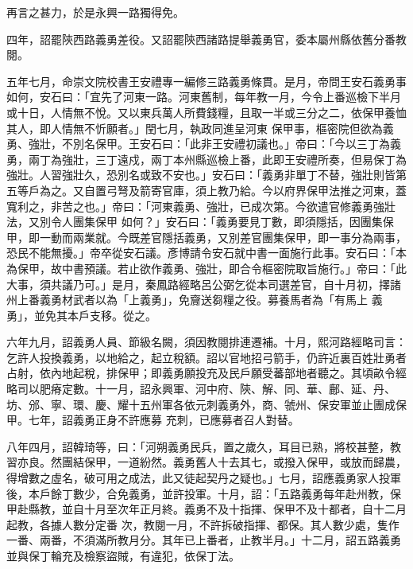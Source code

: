 \begin{pinyinscope}
 再言之甚力，於是永興一路獨得免。



 四年，詔罷陝西路義勇差役。又詔罷陝西諸路提舉義勇官，委本屬州縣依舊分番教閱。



 五年七月，命崇文院校書王安禮專一編修三路義勇條貫。是月，帝問王安石義勇事如何，安石曰：「宜先了河東一路。河東舊制，每年教一月，今令上番巡檢下半月或十日，人情無不悅。又以東兵萬人所費錢糧，且取一半或三分之二，依保甲養恤其人，即人情無不忻願者。」閏七月，執政同進呈河東
 保甲事，樞密院但欲為義勇、強壯，不別名保甲。王安石曰：「此非王安禮初議也。」帝曰：「今以三丁為義勇，兩丁為強壯，三丁遠戍，兩丁本州縣巡檢上番，此即王安禮所奏，但易保丁為強壯。人習強壯久，恐別名或致不安也。」安石曰：「義勇非單丁不替，強壯則皆第五等戶為之。又自置弓弩及箭寄官庫，須上教乃給。今以府界保甲法推之河東，蓋寬利之，非苦之也。」帝曰：「河東義勇、強壯，已成次第。今欲遣官修義勇強壯法，又別令人團集保甲
 如何？」安石曰：「義勇要見丁數，即須隱括，因團集保甲，即一動而兩業就。今既差官隱括義勇，又別差官團集保甲，即一事分為兩事，恐民不能無擾。」帝卒從安石議。彥博請令安石就中書一面施行此事。安石曰：「本為保甲，故中書預議。若止欲作義勇、強壯，即合令樞密院取旨施行。」帝曰：「此大事，須共議乃可。」是月，秦鳳路經略呂公弼乞從本司選差官，自十月初，擇諸州上番義勇材武者以為「上義勇」，免齎送芻糧之役。募養馬者為「有馬上
 義勇」，並免其本戶支移。從之。



 六年九月，詔義勇人員、節級名闕，須因教閱排連遷補。十月，熙河路經略司言：乞許人投換義勇，以地給之，起立稅額。詔以官地招弓箭手，仍許近裏百姓壯勇者占射，依內地起稅，排保甲；即義勇願投充及民戶願受蕃部地者聽之。其頃畝令經略司以肥瘠定數。十一月，詔永興軍、河中府、陝、解、同、華、鄜、延、丹、坊、邠、寧、環、慶、耀十五州軍各依元刺義勇外，商、虢州、保安軍並止團成保甲。七年，詔義勇正身不許應募
 充刺，已應募者召人對替。



 八年四月，詔韓琦等，曰：「河朔義勇民兵，置之歲久，耳目已熟，將校甚整，教習亦良。然團結保甲，一道紛然。義勇舊人十去其七，或撥入保甲，或放而歸農，得增數之虛名，破可用之成法，此又徒起契丹之疑也。」七月，詔應義勇家人投軍後，本戶餘丁數少，合免義勇，並許投軍。十月，詔：「五路義勇每年赴州教，保甲赴縣教，並自十月至次年正月終。義勇不及十指揮、保甲不及十都者，自十二月起教，各據人數分定番
 次，教閱一月，不許拆破指揮、都保。其人數少處，隻作一番、兩番，不須滿所教月分。其年已上番者，止教半月。」十二月，詔五路義勇並與保丁輪充及檢察盜賊，有違犯，依保丁法。




\end{pinyinscope}
